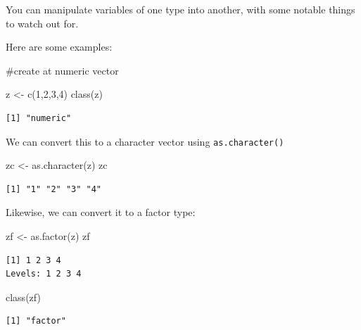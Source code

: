 \documentclass[
  letterpaper,
  DIV=11,
  numbers=noendperiod]{scrreprt}
\newenvironment{Shaded}{\begin{snugshade}}{\end{snugshade}}
\newcommand{\CommentTok}[1]{\textcolor[rgb]{0.37,0.37,0.37}{#1}}
\newcommand{\DecValTok}[1]{\textcolor[rgb]{0.68,0.00,0.00}{#1}}
\newcommand{\FunctionTok}[1]{\textcolor[rgb]{0.28,0.35,0.67}{#1}}
\newcommand{\NormalTok}[1]{\textcolor[rgb]{0.00,0.23,0.31}{#1}}
\newcommand{\OtherTok}[1]{\textcolor[rgb]{0.00,0.23,0.31}{#1}}
\begin{document}
You can manipulate variables of one type into another, with some notable
things to watch out for.

Here are some examples:

\begin{Shaded}
\begin{Highlighting}[]
\CommentTok{\#create at numeric vector}

\NormalTok{z }\OtherTok{\textless{}{-}}  \FunctionTok{c}\NormalTok{(}\DecValTok{1}\NormalTok{,}\DecValTok{2}\NormalTok{,}\DecValTok{3}\NormalTok{,}\DecValTok{4}\NormalTok{)}
\FunctionTok{class}\NormalTok{(z)}
\end{Highlighting}
\end{Shaded}

\begin{verbatim}
[1] "numeric"
\end{verbatim}

We can convert this to a character vector using \texttt{as.character()}

\begin{Shaded}
\begin{Highlighting}[]
\NormalTok{zc }\OtherTok{\textless{}{-}}  \FunctionTok{as.character}\NormalTok{(z)}
\NormalTok{zc}
\end{Highlighting}
\end{Shaded}

\begin{verbatim}
[1] "1" "2" "3" "4"
\end{verbatim}

Likewise, we can convert it to a factor type:

\begin{Shaded}
\begin{Highlighting}[]
\NormalTok{zf }\OtherTok{\textless{}{-}} \FunctionTok{as.factor}\NormalTok{(z)}
\NormalTok{zf}
\end{Highlighting}
\end{Shaded}

\begin{verbatim}
[1] 1 2 3 4
Levels: 1 2 3 4
\end{verbatim}

\begin{Shaded}
\begin{Highlighting}[]
\FunctionTok{class}\NormalTok{(zf)}
\end{Highlighting}
\end{Shaded}

\begin{verbatim}
[1] "factor"
\end{verbatim}
\end{document}
